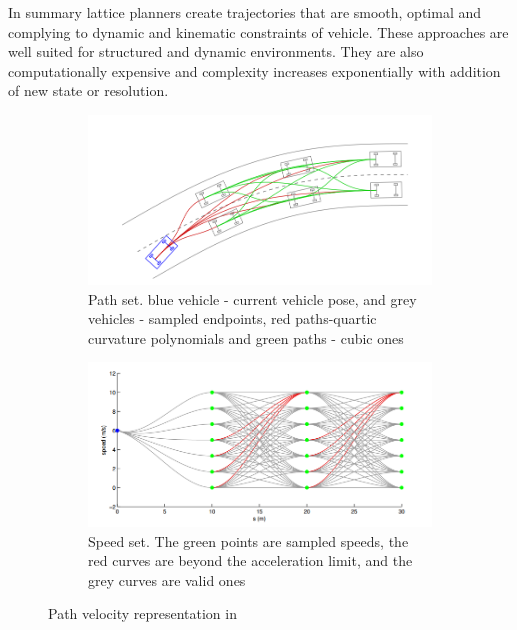 In summary lattice planners create trajectories that are smooth, optimal and complying to dynamic and kinematic constraints of vehicle. These approaches are well suited for structured and dynamic environments. They are also computationally expensive and complexity increases exponentially with addition of new state or resolution. 

\begin{figure}
	\centering
	\begin{subfigure}{.52\textwidth}
		\centering
		\includegraphics[width=1.0\linewidth]{Images/related_work/traj_optim_1.png}
		\caption{Path set. blue vehicle - current vehicle pose, and grey vehicles - sampled endpoints, red paths-quartic curvature polynomials and green paths - cubic ones}
		\label{trajoptsub1}
	\end{subfigure}%
	\begin{subfigure}{.48\textwidth}
		\centering
		\includegraphics[width=1.0\linewidth]{Images/related_work/traj_optim_2.png}
		\caption{Speed set. The green points are sampled speeds, the
red curves are beyond the acceleration limit, and the grey
curves are valid ones}
		\label{trajoptsub2}
	\end{subfigure}
	\caption{Path velocity representation in \cite{traj_planner_optimization}}
	\label{trajopt}
\end{figure}

